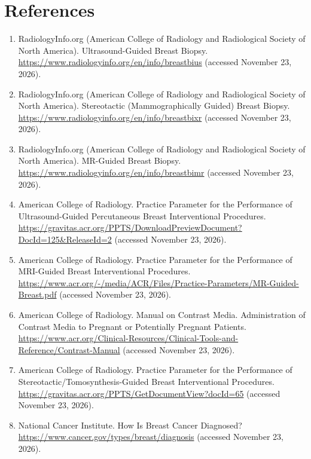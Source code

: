 \section*{References}
\begin{enumerate}
  \item RadiologyInfo.org (American College of Radiology and Radiological Society of North America). Ultrasound-Guided Breast Biopsy. \url{https://www.radiologyinfo.org/en/info/breastbius} (accessed November 23, 2026).
  \item RadiologyInfo.org (American College of Radiology and Radiological Society of North America). Stereotactic (Mammographically Guided) Breast Biopsy. \url{https://www.radiologyinfo.org/en/info/breastbixr} (accessed November 23, 2026).
  \item RadiologyInfo.org (American College of Radiology and Radiological Society of North America). MR-Guided Breast Biopsy. \url{https://www.radiologyinfo.org/en/info/breastbimr} (accessed November 23, 2026).
  \item American College of Radiology. Practice Parameter for the Performance of Ultrasound-Guided Percutaneous Breast Interventional Procedures. \url{https://gravitas.acr.org/PPTS/DownloadPreviewDocument?DocId=125&ReleaseId=2} (accessed November 23, 2026).
  \item American College of Radiology. Practice Parameter for the Performance of MRI-Guided Breast Interventional Procedures. \url{https://www.acr.org/-/media/ACR/Files/Practice-Parameters/MR-Guided-Breast.pdf} (accessed November 23, 2026).
  \item American College of Radiology. Manual on Contrast Media. Administration of Contrast Media to Pregnant or Potentially Pregnant Patients. \url{https://www.acr.org/Clinical-Resources/Clinical-Tools-and-Reference/Contrast-Manual} (accessed November 23, 2026).
  \item American College of Radiology. Practice Parameter for the Performance of Stereotactic/Tomosynthesis-Guided Breast Interventional Procedures. \url{https://gravitas.acr.org/PPTS/GetDocumentView?docId=65} (accessed November 23, 2026).
  \item National Cancer Institute. How Is Breast Cancer Diagnosed? \url{https://www.cancer.gov/types/breast/diagnosis} (accessed November 23, 2026).
\end{enumerate}

\clearpage
